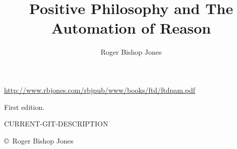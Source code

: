 \documentclass[10pt,a4paper.titlepage,openany,twocolumn]{book}
\author{Roger Bishop Jones}
\title{Positive Philosophy and The Automation of Reason}
\begin{document}
\begin{titlepage}
\maketitle

\vfill

\begin{centering}

{\footnotesize



\href{http://www.rbjones.com/rbjpub/www/books/ftd/ftdpam.pdf}
{http://www.rbjones.com/rbjpub/www/books/ftd/ftdpam.pdf}

First edition.

\vspace{0.2in}

\tiny{CURRENT-GIT-DESCRIPTION}

\vspace{0.2in}

\copyright\ Roger Bishop Jones

}%

\end{centering}

\thispagestyle{empty}
\end{titlepage}

\onecolumn


{\parskip=0pt\tableofcontents}

\vfill

\pagebreak

\twocolumn
\end{document}
